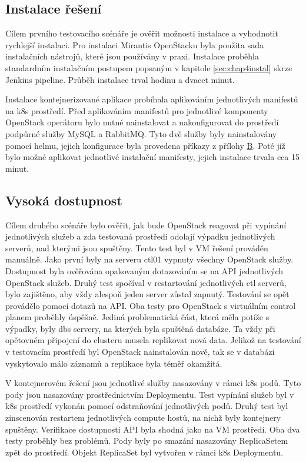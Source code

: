 \subsection{Instalace řešení}
Cílem prvního testovacího scénáře je ověřit možnosti instalace a vyhodnotit rychlejší instalaci. Pro instalaci Mirantis OpenStacku byla použita sada instalačních nástrojů, které jsou používány v praxi. Instalace proběhla standardním instalačním postupem popsaným v kapitole \ref{sec:chap4instal} skrze Jenkins pipeline. Průběh instalace trval hodinu a dvacet minut.

Instalace kontejnerizované aplikace probíhala aplikováním jednotlivých manifestů na k8s prostředí. Před aplikováním manifestů pro jednotlivé komponenty OpenStack operátoru bylo nutné nainstalovat a nakonfigurovat do prostředí podpůrné služby MySQL a RabbitMQ. Tyto dvě služby byly nainstalovány pomocí helmu, jejich konfigurace byla provedena příkazy z přílohy \hyperref[atch:command]{B}. Poté již bylo možné aplikovat jednotlivé instalační manifesty, jejich instalace trvala cca 15 minut.

\subsection{Vysoká dostupnost}
Cílem druhého scénáře bylo ověřit, jak bude OpenStack reagovat při vypínání jednotlivých služeb a zda testovaná prostředí odolají výpadku jednotlivých serverů, nad kterými jsou spuštěny. Tento test byl v VM řešení prováděn manuálně. Jako první byly na serveru ctl01 vypnuty všechny OpenStack služby. Dostupnost byla ověřována opakovaným dotazováním se na API jednotlivých OpenStack služeb. Druhý test spočíval v restartování jednotlivých ctl serverů, bylo zajištěno, aby vždy alespoň jeden server zůstal zapnutý. Testování se opět provádělo pomocí dotazů na API. Oba testy pro OpenStack s virtuálním control planem proběhly úspěšně. Jediná problematická část, která měla  potíže s výpadky, byly dbs servery, na kterých byla spuštěná databáze. Ta vždy při opětovném připojení do clusteru musela replikovat nová data. Jelikož na testování v testovacím prostředí byl OpenStack nainstalován nově, tak se v databázi vyskytovalo málo záznamů a replikace byla téměř okamžitá.

V kontejnerovém řešení jsou jednotlivé služby nasazovány v rámci k8s podů. Tyto pody jsou nasazovány prostřednictvím Deploymentu. Test vypínání služeb byl v k8s prostředí vykonán pomocí odstraňování jednotlivých podů. Druhý test byl zinscenován restartem jednotlivých compute hostů, na nichž byly kontejnery spuštěny. Verifikace dostupnosti API byla shodná jako na VM prostředí. Oba dva testy proběhly bez problémů. Pody byly po smazání nasazovány ReplicaSetem zpět do prostředí. Objekt ReplicaSet byl vytvořen v rámci k8s Deploymentu.

